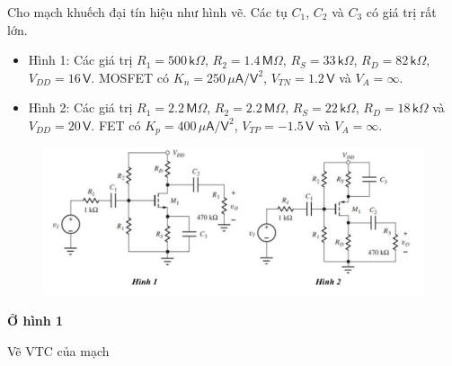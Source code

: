 
Cho mạch khuếch đại tín hiệu như hình vẽ. Các tụ $C_{1}$, $C_{2}$ và $C_{3}$ có giá trị rất lớn.

\begin{itemize}[label=-]
	\item  Hình 1: Các giá trị $R_{1} = 500\,\textsf{k}\Omega$, $R_{2} = 1.4\,\textsf{M}\Omega$, $R_{S} = 33\,\textsf{k}\Omega$, $R_{D} = 82\,\textsf{k}\Omega$, $V_{DD} = 16\,\textsf{V}$. MOSFET có $K_{n} = 250\,\mu\textsf{A}/\textsf{V}^{2}$, $V_{TN} = 1.2\,\textsf{V}$ và $V_{A} = \infty$. 
	\item  Hình 2: Các giá trị $R_{1} = 2.2\,\textsf{M}\Omega$, $R_{2} = 2.2\,\textsf{M}\Omega$, $R_{S} = 22\,\textsf{k}\Omega$, $R_{D} = 18\,\textsf{k}\Omega$ và $V_{DD} = 20\,\textsf{V}$. FET có $K_{p} = 400\,\mu\textsf{A}/\textsf{V}^{2}$, $V_{TP} = -1.5\,\textsf{V}$ và $V_{A} = \infty$. 
\end{itemize}

\begin{figure}[H]
	\centering
	\includegraphics[width=\linewidth]{./my-chapters/my-images/Question1/debai.png}
\end{figure}

\begin{center}
	\textbf{Ở hình 1}
\end{center}


\noindent Vẽ VTC của mạch

